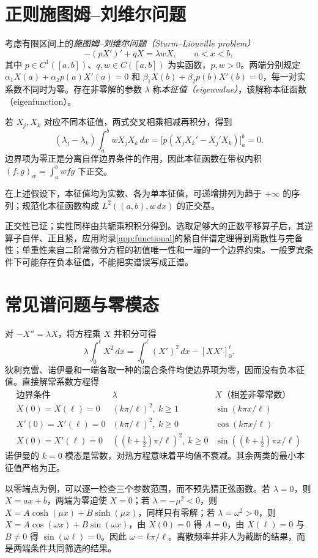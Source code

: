 \section{正则施图姆--刘维尔问题}
考虑有限区间上的\emph{施图姆--刘维尔问题（Sturm--Liouville problem）}
\begin{equation}
 -(pX')'+qX=\lambda wX,\qquad a<x<b,
 \label{eq:sturm-liouville}
\end{equation}
其中 $p\in C^1([a,b])$、$q,w\in C([a,b])$ 为实函数，$p,w>0$。两端分别规定 $\alpha_1X(a)+\alpha_2p(a)X'(a)=0$ 和 $\beta_1X(b)+\beta_2p(b)X'(b)=0$，每一对实系数不同时为零。存在非零解的参数 $\lambda$ 称\emph{本征值（eigenvalue）}，该解称本征函数（eigenfunction）。

若 $X_j,X_k$ 对应不同本征值，两式交叉相乘相减再积分，得到
\[
 (\lambda_j-\lambda_k)\int_a^b wX_jX_k\,dx
 =\bigl[p(X_jX_k'-X_j'X_k)\bigr]_a^b=0.
\]
边界项为零正是分离自伴边界条件的作用，因此本征函数在带权内积 $(f,g)_w=\int_a^b wfg$ 下正交。

\begin{theorem}[正则谱结论]
在上述假设下，本征值均为实数、各为单本征值，可递增排列为趋于 $+\infty$ 的序列；规范化本征函数构成 $L^2((a,b),w\,dx)$ 的正交基。
\end{theorem}
正交性已证；实性同样由共轭乘积积分得到。选取足够大的正数平移算子后，其逆算子自伴、正且紧，应用附录\ref{app:functional}的紧自伴谱定理得到离散性与完备性；单重性来自二阶常微分方程的初值唯一性和一端的一个边界约束。一般罗宾条件下可能存在负本征值，不能把实谱误写成正谱。

\section{常见谱问题与零模态}
对 $-X''=\lambda X$，将方程乘 $X$ 并积分可得
\[
 \lambda\int_0^\ell X^2\,dx=\int_0^\ell(X')^2\,dx-[XX']_0^\ell.
\]
狄利克雷、诺伊曼和一端各取一种的混合条件均使边界项为零，因而没有负本征值。直接解常系数方程得
\[
\begin{array}{c|c|c}
 \text{边界条件}&\lambda&X\text{（相差非零常数）}\\\hline
 X(0)=X(\ell)=0&(k\pi/\ell)^2,\ k\ge1&\sin(k\pi x/\ell)\\
 X'(0)=X'(\ell)=0&(k\pi/\ell)^2,\ k\ge0&\cos(k\pi x/\ell)\\
 X(0)=X'(\ell)=0&((k+\tfrac12)\pi/\ell)^2,\ k\ge0&\sin((k+\tfrac12)\pi x/\ell)
\end{array}
\]
诺伊曼的 $k=0$ 模态是常数，对热方程意味着平均值不衰减。其余两类的最小本征值严格为正。

以零端点为例，可以逐一检查三个参数范围，而不预先猜正弦函数。若 $\lambda=0$，则 $X=ax+b$，两端为零迫使 $X=0$；若 $\lambda=-\mu^2<0$，则 $X=A\cosh(\mu x)+B\sinh(\mu x)$，同样只有零解；若 $\lambda=\omega^2>0$，则 $X=A\cos(\omega x)+B\sin(\omega x)$，由 $X(0)=0$ 得 $A=0$，由 $X(\ell)=0$ 与 $B\ne0$ 得 $\sin(\omega\ell)=0$。因此 $\omega=k\pi/\ell$。离散频率并非人为截断的结果，而是两端条件共同筛选的结果。

